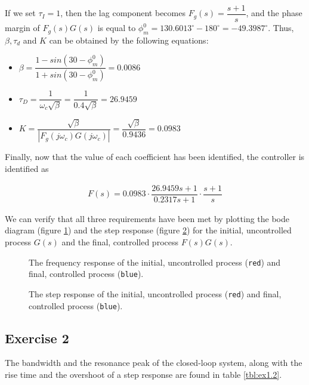 If we set $\tau_I = 1$, then the lag component becomes $F_g(s) = \dfrac{s+1}{s}$,
and the phase margin of $F_g(s)G(s)$ is equal to
$\phi_m^0 = 130.6013^{\circ} - 180^{\circ} = -49.3987^{\circ}$. Thus,
$\beta, \tau_d$ and $K$ can be obtained by the following equations:

\begin{itemize}
  \item $\beta = \dfrac{1 - sin(30 - \phi_m^0)}{1 + sin(30 - \phi_m^0)} = 0.0086$
  \item $\tau_D = \dfrac{1}{\omega_c\sqrt\beta} = \dfrac{1}{0.4\sqrt\beta} = 26.9459$
  \item $K = \dfrac{\sqrt\beta}{|F_g(j\omega_c)G(j\omega_c)|} =
    \dfrac{\sqrt\beta}{0.9436} = 0.0983$
\end{itemize}

Finally, now that the value of each coefficient has been identified, the
controller is identified as

\begin{align*}
  F(s) = 0.0983 \cdot \dfrac{26.9459 s + 1}{0.2317 s + 1} \cdot \dfrac{s + 1}{s}
\end{align*}

We can verify that all three requirements have been met by plotting the bode
diagram (figure \ref{fig:bode_1.1}) and the step response
(figure \ref{fig:step_response_1.1}) for the initial, uncontrolled process $G(s)$
and the final, controlled process $F(s)G(s)$.


\begin{figure}[H]\centering
  \scalebox{1}{}
  \caption{The frequency response of the initial, uncontrolled process
    (\texttt{red}) and final, controlled process (\texttt{blue}).}
  \label{fig:bode_1.1}
\end{figure}

\begin{figure}[H]\centering
  \scalebox{0.8}{}
  \caption{The step response of the initial, uncontrolled process
    (\texttt{red}) and final, controlled process (\texttt{blue}).}
  \label{fig:step_response_1.1}
\end{figure}


\subsection{Exercise 2}

The bandwidth and the resonance peak of the closed-loop system, along with the
rise time and the overshoot of a step response are found in table \ref{tbl:ex1.2}.

